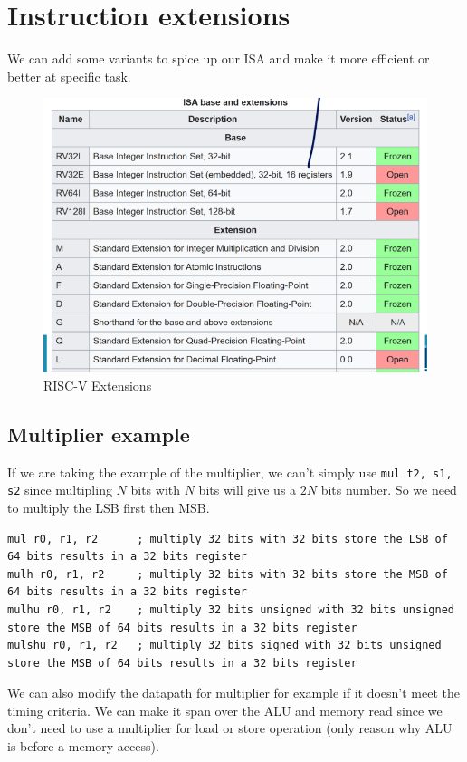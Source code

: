 \documentclass{report}
\begin{document}
\section{Instruction extensions}

We can add some variants to spice up our ISA and make it more efficient or better at specific task.

\begin{figure}[H]
    \centering
    \includegraphics[width=0.55\linewidth]{RISCV_extensions.png}
    \caption{RISC-V Extensions}
    \label{fig:riscv-extensions-label}
\end{figure}

\subsection{Multiplier example}

If we are taking the example of the multiplier, we can't simply use \verb|mul t2, s1, s2| since multipling $N$ bits with $N$ bits will give us a $2N$ bits number. So we need to multiply the LSB first then MSB.

\begin{lstlisting}[language={[x86masm]Assembler}]
mul r0, r1, r2      ; multiply 32 bits with 32 bits store the LSB of 64 bits results in a 32 bits register
mulh r0, r1, r2     ; multiply 32 bits with 32 bits store the MSB of 64 bits results in a 32 bits register
mulhu r0, r1, r2    ; multiply 32 bits unsigned with 32 bits unsigned store the MSB of 64 bits results in a 32 bits register
mulshu r0, r1, r2   ; multiply 32 bits signed with 32 bits unsigned store the MSB of 64 bits results in a 32 bits register
\end{lstlisting}

We can also modify the datapath for multiplier for example if it doesn't meet the timing criteria. We can make it span over the ALU and memory read since we don't need to use a multiplier for load or store operation (only reason why ALU is before a memory access).\\
\end{document}
